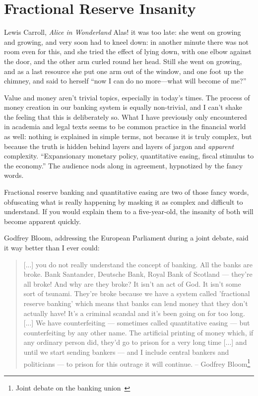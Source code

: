 \chapter{Fractional Reserve Insanity}
\label{les:13}

\begin{chapquote}{Lewis Carroll, \textit{Alice in Wonderland}}
Alas! it was too late: she went on growing and growing, and very soon had to
kneel down: in another minute there was not room even for this, and she tried
the effect of lying down, with one elbow against the door, and the other arm
curled round her head. Still she went on growing, and as a last resource she put
one arm out of the window, and one foot up the chimney, and said to herself
\enquote{now I can do no more—what will become of me?}
\end{chapquote}

Value and money aren't trivial topics, especially in today's times. The
process of money creation in our banking system is equally non-trivial,
and I can't shake the feeling that this is deliberately so. What I have
previously only encountered in academia and legal texts seems to be
common practice in the financial world as well: nothing is explained in
simple terms, not because it is truly complex, but because the truth is
hidden behind layers and layers of jargon and \textit{apparent} complexity.
\enquote{Expansionary monetary policy, quantitative easing, fiscal stimulus to
the economy.} The audience nods along in agreement, hypnotized by the
fancy words.

Fractional reserve banking and quantitative easing are two of those
fancy words, obfuscating what is really happening by masking it as
complex and difficult to understand. If you would explain them to a
five-year-old, the insanity of both will become apparent quickly.

Godfrey Bloom, addressing the European Parliament during a joint
debate, said it way better than I ever could:

\begin{samepage}\begin{quotation}
[...] you do not really understand the concept of banking. All the
banks are broke. Bank Santander, Deutsche Bank, Royal Bank of
Scotland --- they're all broke! And why are they broke? It isn't an
act of God. It isn't some sort of tsunami. They're broke because we
have a system called 'fractional reserve banking' which means that
banks can lend money that they don't actually have! It's a criminal
scandal and it's been going on for too long. [...]
We have counterfeiting --- sometimes called quantitative
easing --- but counterfeiting by any other name. The artificial
printing of money which, if any ordinary person did, they'd go to
prison for a very long time [...] and until we start sending
bankers --- and I include central bankers and politicians --- to
prison for this outrage it will continue.
\flushright -- Godfrey Bloom\footnote{Joint debate on the
banking union~\cite{godfrey-bloom}}
\end{quotation}\end{samepage}

